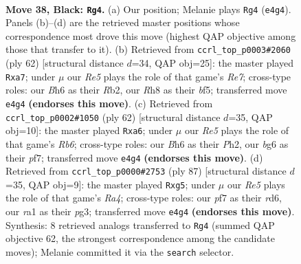\documentclass[11pt]{article}
\begin{document}
\clearpage

\begin{figure}[p]\centering
\begin{subfigure}{0.46\textwidth}\centering
\resizebox{\linewidth}{!}{%
\newchessgame
\chessboard[
  setfen={1k5r/5P2/p1P3Bb/5R2/1P2r2p/8/5K2/R7 b - - 0 38},
  showmover=false,
  pgfstyle=straightmove, color=movearrow, markmove={e4-g4}
]}
\caption{}
\end{subfigure}\hfill
\begin{subfigure}{0.46\textwidth}\centering
\resizebox{\linewidth}{!}{%
\newchessgame
\chessboard[
  setfen={5rk1/p3R2p/6pP/5b2/7r/8/PR4B1/6K1 w - - 6 32},
  showmover=false,
  pgfstyle=straightmove, color=movearrow, markmove={e7-a7}
]}
\caption{}
\end{subfigure}
\\[4pt]
\begin{subfigure}{0.46\textwidth}\centering
\resizebox{\linewidth}{!}{%
\newchessgame
\chessboard[
  setfen={6k1/5p2/pR6/6r1/4rp2/1P6/1P5P/1K3R2 w - - 0 32},
  showmover=false,
  pgfstyle=straightmove, color=movearrow, markmove={b6-a6}
]}
\caption{}
\end{subfigure}\hfill
\begin{subfigure}{0.46\textwidth}\centering
\resizebox{\linewidth}{!}{%
\newchessgame
\chessboard[
  setfen={8/1r5k/p2R4/r5Pp/P3R3/6PK/8/8 b - - 0 44},
  showmover=false,
  pgfstyle=straightmove, color=movearrow, markmove={a5-g5}
]}
\caption{}
\end{subfigure}
\caption{\textbf{Move 38, Black: \texttt{Rg4}.} (a) Our position; Melanie plays \texttt{Rg4} (\texttt{e4g4}). Panels (b)--(d) are the retrieved master positions whose correspondence most drove this move (highest QAP objective among those that transfer to it). (b) Retrieved from \texttt{ccrl\_top\_p0003\#2060} (ply 62) [structural distance $d$=34, QAP obj=25]: the master played \texttt{Rxa7}; under $\mu$ our \emph{Re5} plays the role of that game's \emph{Re7}; cross-type roles: our \emph{B}h6 as their \emph{R}b2, our \emph{R}h8 as their \emph{b}f5; transferred move \texttt{e4g4} \textbf{(endorses this move)}. (c) Retrieved from \texttt{ccrl\_top\_p0002\#1050} (ply 62) [structural distance $d$=35, QAP obj=10]: the master played \texttt{Rxa6}; under $\mu$ our \emph{Re5} plays the role of that game's \emph{Rb6}; cross-type roles: our \emph{B}h6 as their \emph{P}h2, our \emph{b}g6 as their \emph{p}f7; transferred move \texttt{e4g4} \textbf{(endorses this move)}. (d) Retrieved from \texttt{ccrl\_top\_p0000\#2753} (ply 87) [structural distance $d$=35, QAP obj=9]: the master played \texttt{Rxg5}; under $\mu$ our \emph{Re5} plays the role of that game's \emph{Ra4}; cross-type roles: our \emph{p}f7 as their \emph{r}d6, our \emph{r}a1 as their \emph{p}g3; transferred move \texttt{e4g4} \textbf{(endorses this move)}. Synthesis: 8 retrieved analogs transferred to \texttt{Rg4} (summed QAP objective 62, the strongest correspondence among the candidate moves); Melanie committed it via the \texttt{search} selector.}
\label{fig:thought-m75}
\end{figure}
\end{document}
